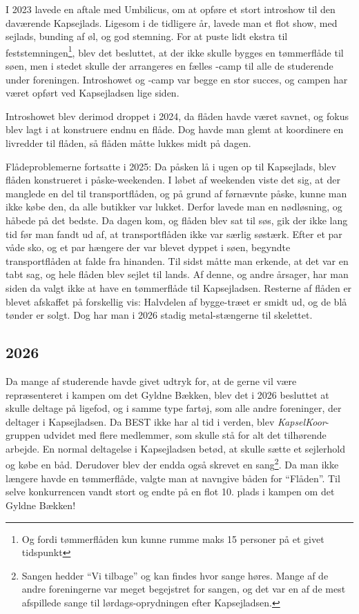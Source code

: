 I 2023 lavede \TKET en aftale med Umbilicus, om at opføre et stort introshow til den daværende Kapsejlads. Ligesom i de tidligere år, lavede man et flot show, med sejlads, bunding af øl, og god stemning. For at puste lidt ekstra til feststemningen\footnote{Og fordi tømmerflåden kun kunne rumme maks 15 personer på et givet tidspunkt}, blev det besluttet, at der ikke skulle bygges en tømmerflåde til søen, men i stedet skulle der arrangeres en fælles \TK-camp til alle de studerende under foreningen. Introshowet og \TK-camp var begge en stor succes, og campen har været opført ved Kapsejladsen lige siden.

Introshowet blev derimod droppet i 2024, da flåden havde været savnet, og fokus blev lagt i at konstruere endnu en flåde. Dog havde man glemt at koordinere en livredder til flåden, så flåden måtte lukkes midt på dagen. 

Flådeproblemerne fortsatte i 2025: Da påsken lå i ugen op til Kapsejlads, blev flåden konstrueret i påske-weekenden. I løbet af weekenden viste det sig, at der manglede en del til transportflåden, og på grund af førnævnte påske, kunne man ikke købe den, da alle butikker var lukket. Derfor lavede man en nødløsning, og håbede på det bedste. Da dagen kom, og flåden blev sat til søs, gik der ikke lang tid før man fandt ud af, at transportflåden ikke var særlig søstærk. Efter et par våde sko, og et par hængere der var blevet dyppet i søen, begyndte transportflåden at falde fra hinanden. Til sidst måtte man erkende, at det var en tabt sag, og hele flåden blev sejlet til lands. Af denne, og andre årsager, har man siden da valgt ikke at have en tømmerflåde til Kapsejladsen. Resterne af flåden er blevet afskaffet på forskellig vis: Halvdelen af bygge-træet er smidt ud, og de blå tønder er solgt. Dog har man i 2026 stadig metal-stængerne til skelettet.

\subsection{2026}
Da mange af \TKETs studerende havde givet udtryk for, at de gerne vil være repræsenteret i kampen om det Gyldne Bækken, blev det i 2026 besluttet at \TKET skulle deltage på ligefod, og i samme type fartøj, som alle andre foreninger, der deltager i Kapsejladsen. Da BEST ikke har al tid i verden, blev \textit{KapselKoor}-gruppen udvidet med flere medlemmer, som skulle stå for alt det tilhørende arbejde. En normal deltagelse i Kapsejladsen betød, at \TKET skulle sætte et sejlerhold og købe en båd. Derudover blev der endda også skrevet en sang\footnote{Sangen hedder ``Vi tilbage'' og kan findes hvor sange høres. Mange af de andre foreningerne var meget begejstret for sangen, og det var en af de mest afspillede sange til lørdags-oprydningen efter Kapsejladsen.}. Da man ikke længere havde en tømmerflåde, valgte man at navngive båden for ``Flåden''. Til selve konkurrencen vandt \TKET stort og endte på en flot 10. plads i kampen om det Gyldne Bækken!
